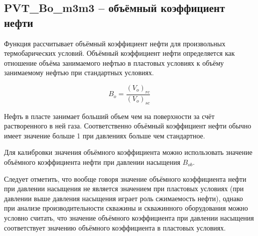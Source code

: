\documentclass[]{scrreprt}
\begin{document}
\newcommand{\RsDataFile}{data/Rs_P_data.txt}


\subsection{PVT\_Bo\_m3m3 – объёмный коэффициент нефти}

Функция рассчитывает объёмный коэффициент нефти для произвольных термобарических условий. 
Объёмный коэффициент нефти определяется как отношение объёма занимаемого нефтью в пластовых условиях к объёму занимаемому нефтью при стандартных условиях. 

$$B_o = \frac{(V_o)_{rc}}{(V_o)_{sc}}$$

Нефть в пласте занимает больший объем чем на поверхности за счёт растворенного в ней газа. Соответственно объёмный коэффициент нефти обычно имеет значение больше 1 при давлениях больше чем стандартное.

Для калибровки значения объёмного коэффициента можно использовать значение объёмного коэффициента нефти при давлении насыщения $B_{ob}$. 

Следует отметить, что вообще говоря значение объёмного коэффициента нефти при давлении насыщения не является значением при пластовых условиях (при давлении выше давления насыщения играет роль сжимаемость нефти), однако при анализе производительности скважины и скважинного оборудования можно условно считать, что значение объёмного коэффициента при давлении насыщения соответствует значению  объёмного коэффициента в пластовых условиях.  
\end{document}
